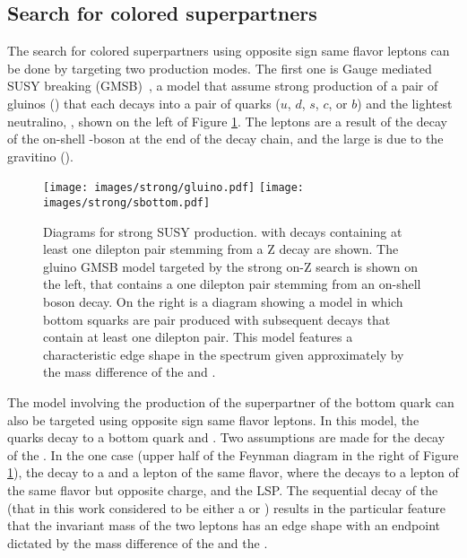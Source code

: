 \subsection*{Search for colored superpartners}\label{sec:searchStrong}
\noindent
\justify
The search for colored superpartners using opposite sign same flavor leptons can be done by targeting two production modes. 
The first one is Gauge mediated SUSY breaking (GMSB)~\cite{Matchev:1999ft,Meade:2009qv,Ruderman}, a model that assume strong production of a pair of gluinos (\gluino) that each decays into a pair of quarks ($u$, $d$, $s$, $c$, or $b$) and the lightest neutralino, \PSGczDo, shown on the left of Figure \ref{fig:feynmanStrong}. 
The leptons are a result of the decay of the on-shell \PZ-boson at the end of the decay chain, and the large \ptmiss is due to the gravitino (\gravitino). 
\begin{figure}[!htp]
\centering
\texttt{[image: images/strong/gluino.pdf]}
\texttt{[image: images/strong/sbottom.pdf]}
\caption{Diagrams for strong SUSY production.  
with decays containing at least one dilepton pair stemming from a Z decay are shown. 
The gluino GMSB model targeted by the strong on-Z search is shown on the left, that contains a one dilepton pair stemming from an on-shell \PZ boson decay. On the right is a diagram showing a model in which bottom squarks are pair produced with subsequent decays that contain at least one dilepton pair. This model features a characteristic edge shape in the \mll spectrum given approximately by the mass difference of the \PSGczDt and \PSGczDo.}
\label{fig:feynmanStrong}
\end{figure}                                                                                                                                          
The model involving the production of the superpartner of the bottom quark can also be targeted using opposite sign same flavor leptons.
In this model, the \sbottom quarks decay to a bottom quark and \PSGczDt. 
Two assumptions are made for the decay of the \PSGczDt. 
In the one case (upper half of the Feynman diagram in the right of Figure \ref{fig:feynmanStrong}), the \PSGczDt decay to a \slep and a lepton of the same flavor, where the \slep decays to a lepton of the same flavor but opposite charge, and the \PSGczDo LSP.   
The sequential decay of the \slep (that in this work considered to be either a \se or \sm) results in the particular feature that the invariant mass of the two leptons has an edge shape with an endpoint dictated by the mass difference of the \PSGczDt and the \PSGczDo. 
